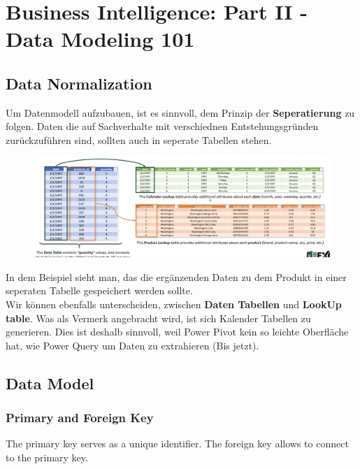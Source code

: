 \section{Business Intelligence: Part II - Data Modeling 101}
\subsection{Data Normalization}
 Um Datenmodell aufzubauen, ist es sinnvoll, dem Prinzip der \textbf{Seperatierung} zu folgen. Daten die auf Sachverhalte mit verschiednen Entstehungsgründen zurückzuführen sind, sollten auch in seperate Tabellen stehen.
 

\begin{figure}[H]
	\centering
	\includegraphics[scale = 0.3]{attachment/chapter_1/screenshot046}
	\caption{}
	\label{fig:screenshot046}
\end{figure}

In dem Beispiel sieht man, das die ergänzenden Daten zu dem Produkt in einer seperaten Tabelle gespeichert werden sollte.\\ 
Wir können ebenfalls unterscheiden, zwischen \textbf{Daten Tabellen} und \textbf{LookUp table}. Was als Vermerk angebracht wird, ist sich Kalender Tabellen zu generieren. Dies ist deshalb sinnvoll, weil Power Pivot kein so leichte Oberfläche hat, wie Power Query um Daten zu extrahieren (Bis jetzt).

\subsection{Data Model}

\subsubsection{Primary and Foreign Key}
The primary key serves as a unique identifier. The foreign key allows to connect to the primary key.

